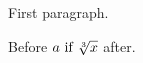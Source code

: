 \documentclass{article}
\begin{document}
First paragraph.

Before $a \text{ if } \sqrt[3]{x }$ after.
\end{document}
